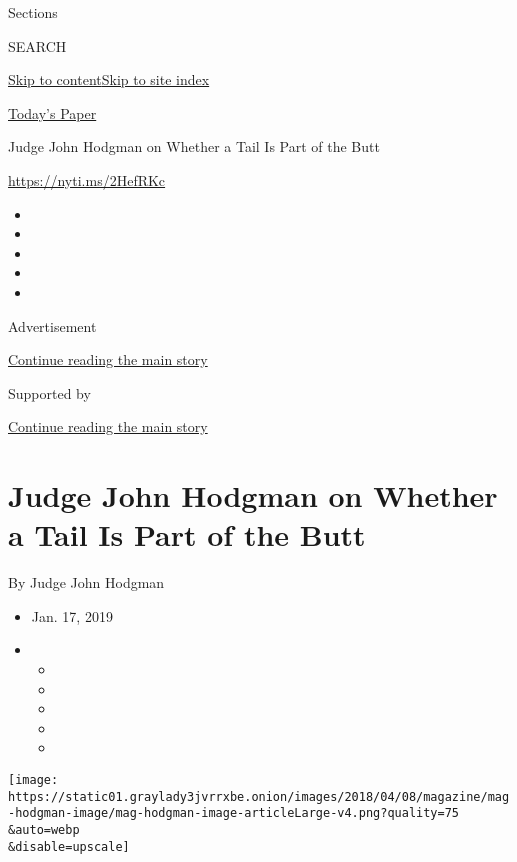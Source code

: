 Sections

SEARCH

\protect\hyperlink{site-content}{Skip to
content}\protect\hyperlink{site-index}{Skip to site index}

\href{https://myaccount.nytimes3xbfgragh.onion/auth/login?response_type=cookie\&client_id=vi}{}

\href{https://www.nytimes3xbfgragh.onion/section/todayspaper}{Today's
Paper}

Judge John Hodgman on Whether a Tail Is Part of the Butt

\url{https://nyti.ms/2HefRKc}

\begin{itemize}
\item
\item
\item
\item
\item
\end{itemize}

Advertisement

\protect\hyperlink{after-top}{Continue reading the main story}

Supported by

\protect\hyperlink{after-sponsor}{Continue reading the main story}

\hypertarget{judge-john-hodgman-on-whether-a-tail-is-part-of-the-butt}{%
\section{Judge John Hodgman on Whether a Tail Is Part of the
Butt}\label{judge-john-hodgman-on-whether-a-tail-is-part-of-the-butt}}

By Judge John Hodgman

\begin{itemize}
\item
  Jan. 17, 2019
\item
  \begin{itemize}
  \item
  \item
  \item
  \item
  \item
  \end{itemize}
\end{itemize}

\texttt{[image: https://static01.graylady3jvrrxbe.onion/images/2018/04/08/magazine/mag-hodgman-image/mag-hodgman-image-articleLarge-v4.png?quality=75\\\&auto=webp\\\&disable=upscale]}

